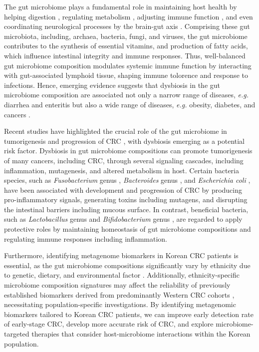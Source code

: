 \documentclass[11pt, a4paper, onecolumn, oneside]{report}
\begin{document}
            The gut microbiome plays a fundamental role in maintaining host health by helping digestion \cite{gut-digestion-1, gut-digestion-2}, regulating metabolism \cite{gut-metabolism-1, gut-metabolism-2, gut-metabolism-3}, adjusting immune function \cite{gut-immune-1, gut-immune-2, gut-immune-3}, and even coordinating neurological processes by the brain-gut axis \cite{brain-gut-1, brain-gut-2, brain-gut-3}. Comprising these gut microbiota, including, archaea, bacteria, fungi, and viruses, the gut microbiome contributes to the synthesis of essential vitamins, and production of fatty acids, which influence intestinal integrity and immune responses. Thus, well-balanced gut microbiome composition modulates systemic immune function by interacting with gut-associated lymphoid tissue, shaping immune tolorence and response to infections. Hence, emerging evidence suggests that dysbiosis in the gut microbiome composition are associated not only a narrow range of diseases, \textit{e.g.} diarrhea and enteritis \cite{gut-diarrhea-1, gut-diarrhea-2} but also a wide range of diseases, \textit{e.g.} obesity, diabetes, and cancers \cite{microbiome-diabetes-1, microbiome-diabetes-2, microbiome-cancer-1, microbiome-cancer-2}.

            Recent studies have highlighted the crucial role of the gut microbiome in tumorigenesis and progression of CRC \cite{gut-CRC-1, gut-CRC-2}, with dysbiosis emerging as a potential risk factor. Dysbiosis in gut microbiome compositions can promote tumorigenesis of many cancers, including CRC, through several signaling cascades, including inflammation, mutagenesis, and altered metabolism in host. Certain bacteria species, such as \textit{Fusobacterium} genus \cite{Fusobacterium-5, Fusobacterium-6, Fusobacterium-7}, \textit{Bacteroides} genus \cite{Bacteroides-1, Bacteroides-2}, and \textit{Escherichia coli} \cite{Escherichia-1, Escherichia-2}, have been associated with development and progression of CRC by producing pro-inflammatory signals, generating toxins including mutagens, and disrupting the intestinal barriers including mucous surface. In contrast, beneficial bacteria, such as \textit{Lactobacillus} genus \cite{Lactobacillus-1, Lactobacillus-2} and \textit{Bifidobacterium} genus \cite{Bifidobacterium-1, Bifidobacterium-2}, are regarded to apply protective roles by maintaining homeostasis of gut microbiome compositions and regulating immune responses including inflammation.

            Furthermore, identifying metagenome biomarkers in Korean CRC patients is essential, as the gut microbiome compositions significantly vary by ethnicity due to genetic, dietary, and environmental factor \cite{CRC-ethnic-1, CRC-ethnic-2, CRC-ethnic-3}. Additionally, ethnicity-specific microbiome composition signatures may affect the reliability of previously established biomarkers derived from predominantly Western CRC cohorts \cite{CRC-TCGA-1}, necessitating population-specific investigations. By identifying metagenomic biomarkers tailored to Korean CRC patients, we can improve early detection rate of early-stage CRC, develop more accurate risk of CRC, and explore microbiome-targeted therapies that consider host-microbiome interactions within the Korean population.
\end{document}

